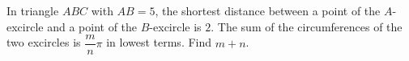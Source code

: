 In triangle $ABC$ with $AB=5$, the shortest distance between a point of the $A$-excircle and a point of the $B$-excircle is $2$. The sum of the circumferences of the two excircles is $\dfrac mn\pi$ in lowest terms. Find $m+n$.
